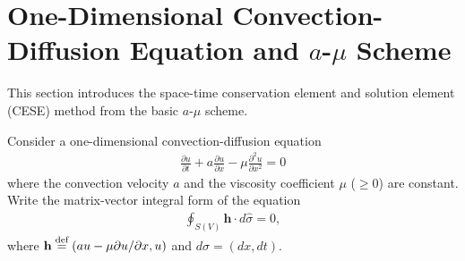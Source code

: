 \documentclass[11pt,dvips]{article}
\numberwithin{equation}{section}
\newcommand{\defeq}{\ensuremath{\buildrel {\text{def}}\over{=}}}
\begin{document}
\begin{abstract}
This note is written to introduce the CESE method, from the most basic form to
recently developed schemes: $a$-$\mu$ scheme, $a$ scheme, $a$-$\varepsilon$
scheme \citep{chang_method_1995}, $c$ scheme, and $c$-$\tau$/$c$-$\tau^*$
scheme \citep{chang_multi-dimensional_2003}.  Methods for weighted averaging,
such as $\alpha$ scheme \citep{chang_method_1995}, Scheme-I,
Scheme-II \citep{chang_courant_2002}, W-1 scheme, and W-2
scheme \citep{chang_multi-dimensional_2003} are also stated.  The note is
organized as follows: Section \ref{s:cese_intro} demonstrates the concept of
CESE method with a single viscous model equation.  The CESE method for inviscid
equations is described in Section \ref{s:inviscid_model}.  Formulation of the
CESE method for system of equations is constructed in Section
\ref{s:system_eqn}, and the Euler equations are used as the model equation.
Weighting functions for spatial derivatives are discussed in Section
\ref{s:weighted_average}.  The CFL-insensitive scheme of CESE is discussed in
Section \ref{s:ctau}, along with various weighting function.  In Section
\ref{s:nuni}, non-uniform spatial mesh formulation is introduced.  Local
time-stepping is discussed in Section \ref{s:lts} (to be written).  Section
\ref{s:code} shows the code that produces the results in this note (to be
added).

\end{abstract}
\clearpage

\tableofcontents

\section{One-Dimensional Convection-Diffusion Equation and $a$-$\mu$ Scheme}
\label{s:cese_intro}

This section introduces the space-time conservation element and solution
element (CESE) method from the basic $a$-$\mu$ scheme.

Consider a one-dimensional convection-diffusion equation
\begin{align}
    \frac{\partial u}{\partial t} + a\frac{\partial u}{\partial x}
  - \mu\frac{\partial^2u}{\partial x^2} = 0 \label{e:conv_diff_govern}
\end{align}
where the convection velocity $a$ and the viscosity coefficient $\mu$ ($\ge0$)
are constant.  Write the matrix-vector integral form of the equation
\begin{align}
  \oint_{S(V)}\mathbf{h}\cdot d\hat{\sigma}=0, \label{e:conservation}
\end{align}
where $\mathbf{h} \defeq (au-\mu\partial u/\partial x,u)$ and $d\hat{\sigma} =
(dx, dt)$.
\end{document}
